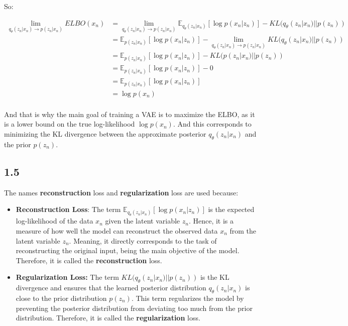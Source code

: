 \documentclass{article}
\begin{document}
So: 

\begin{align*}
    \lim_{q_{\theta}(z_n|x_n) \rightarrow p(z_n|x_n)} ELBO(x_n) &= \lim_{q_{\theta}(z_n|x_n) \rightarrow p(z_n|x_n)} \mathbb{E}_{q_{\theta}(z_n|x_n)}[\log p(x_n|z_n)] - KL(q_{\theta}(z_n|x_n) || p(z_n)) \\
    &= \mathbb{E}_{p(z_n|x_n)}[\log p(x_n|z_n)] - \lim_{q_{\theta}(z_n|x_n) \rightarrow p(z_n|x_n)} KL(q_{\theta}(z_n|x_n) || p(z_n)) \\
    &= \mathbb{E}_{p(z_n|x_n)}[\log p(x_n|z_n)] - KL(p(z_n|x_n) || p(z_n)) \\
    &= \mathbb{E}_{p(z_n|x_n)}[\log p(x_n|z_n)] - 0 \\
    &= \mathbb{E}_{p(z_n|x_n)}[\log p(x_n|z_n)] \\
    &= \log p(x_n) \\
\end{align*}

And that is why the main goal of training a VAE is to maximize the ELBO, as it is a lower bound on the true log-likelihood $\log p(x_n)$.
And this corresponds to minimizing the KL divergence between the approximate posterior $q_{\theta}(z_n|x_n)$ and the prior $p(z_n)$.

\subsection*{1.5}

The names \textbf{reconstruction} loss and \textbf{regularization} loss are used because: 

\begin{itemize}
  \item \textbf{Reconstruction Loss}: The term $\mathbb{E}_{q_{\theta}(z_n|x_n)}[\log p(x_n|z_n)]$ is the expected log-likelihood
  of the data $x_n$ given the latent variable $z_n$. Hence, it is a measure of how well the model can reconstruct the
  observed data $x_n$ from the latent variable $z_n$. Meaning, it directly corresponds to the task of reconstructing the
  original input, being the main objective of the model. Therefore, it is called the \textbf{reconstruction} loss.

  \item\textbf{Regularization Loss:} The term $KL(q_{\theta}(z_n|x_n) || p(z_n))$ is the KL divergence and ensures
that the learned posterior distribution $q_{\theta}(z_n|x_n)$ is close to the prior distribution $p(z_n)$. This term
regularizes the model by preventing the posterior distribution from deviating too much from the prior distribution.
Therefore, it is called the \textbf{regularization} loss.
\end{itemize}
\end{document}
